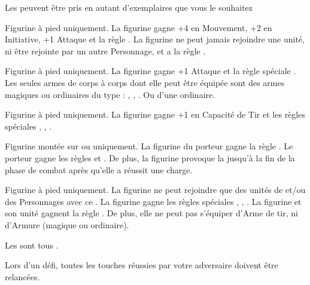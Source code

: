 \begin{multicols}{2}
\startarmynewsection{\kindreds}

\spaceaftersection{}

Les \kindreds{} peuvent être pris en autant d'exemplaires que vous le souhaitez

\startpricelistNSP

Figurine à pied uniquement. La figurine gagne +4 en Mouvement, +2 en Initiative, +1 Attaque et la règle . La figurine ne peut jamais rejoindre une unité, ni être rejointe par un autre Personnage, et a la règle \notaleader{}.

Figurine à pied uniquement. La figurine gagne +1 Attaque et la règle spéciale . Les seules armes de corps à corps dont elle peut être équipée sont des armes magiques ou ordinaires du type : \spear{}, \greatweapon{}, \sylvanblades{}. Ou d'une \hw{} ordinaire.

Figurine à pied uniquement. La figurine gagne +1 en Capacité de Tir et les règles spéciales \scout{}, \masterarchers{}, .

Figurine montée sur \elvenhorse{} ou \greatelk{} uniquement. La figurine du porteur gagne la règle \frenzy{}. Le porteur gagne les règles \devastatingcharge{} et \lighttroops{}. De plus, la figurine provoque la \fear{} jusqu'à la fin de la phase de combat après qu'elle a réussit une charge.

Figurine à pied uniquement. La figurine ne peut rejoindre que des unités de \bladedancers{} et/ou des Personnages avec ce \kindreds{}. La figurine gagne les règles spéciales \dancesofcenyrn{}, \immunetopsychology{}, . La figurine et son unité gagnent la règle \swiftstride{}. De plus, elle ne peut pas s'équiper d'Arme de tir, ni d'Armure (magique ou ordinaire).

\endpricelistNSP

\startarmynewsection{\kindreds}

\spaceaftersection{}

Les \aspectsofnature{} sont tous \oneperarmy{}.

\startpricelistNSP

 Lors d'un défi, toutes les touches réussies par votre adversaire doivent être relancées.


\end{multicols}
